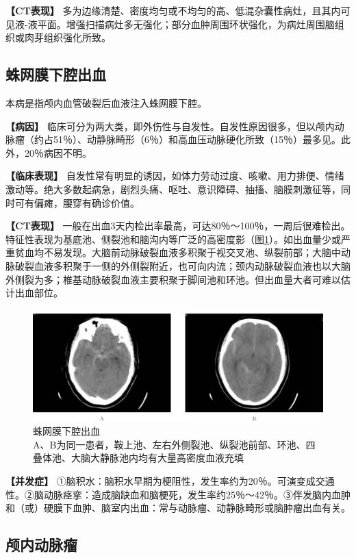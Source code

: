 \textbf{【CT表现】}
多为边缘清楚、密度均匀或不均匀的高、低混杂囊性病灶，且其内可见液-液平面。增强扫描病灶多无强化；部分血肿周围环状强化，为病灶周围脑组织或肉芽组织强化所致。

\subsection{蛛网膜下腔出血}

本病是指颅内血管破裂后血液注入蛛网膜下腔。

\textbf{【病因】}
临床可分为两大类，即外伤性与自发性。自发性原因很多，但以颅内动脉瘤（约占51％）、动静脉畸形（6％）和高血压动脉硬化所致（15％）最多见。此外，20％病因不明。

\textbf{【临床表现】}
自发性常有明显的诱因，如体力劳动过度、咳嗽、用力排便、情绪激动等。绝大多数起病急，剧烈头痛、呕吐、意识障碍、抽搐、脑膜刺激征等，同时可有偏瘫，腰穿有确诊价值。

\textbf{【CT表现】}
一般在出血3天内检出率最高，可达80％～100％，一周后很难检出。特征性表现为基底池、侧裂池和脑沟内等广泛的高密度影（图\ref{fig2-26}）。如出血量少或严重贫血均不易发现。大脑前动脉破裂血液多积聚于视交叉池、纵裂前部；大脑中动脉破裂血液多积聚于一侧的外侧裂附近，也可向内流；颈内动脉破裂血液也以大脑外侧裂为多；椎基动脉破裂血液主要积聚于脚间池和环池。但出血量大者可难以估计出血部位。

\begin{figure}[!htbp]
 \centering
 \includegraphics[width=.7\textwidth,height=\textheight,keepaspectratio]{./images/Image00044.jpg}
 \captionsetup{justification=centering}
 \caption{蛛网膜下腔出血\\{\small A、B为同一患者，鞍上池、左右外侧裂池、纵裂池前部、环池、四叠体池、大脑大静脉池内均有大量高密度血液充填}}
 \label{fig2-26}
  \end{figure} 

\textbf{【并发症】}
①脑积水：脑积水早期为梗阻性，发生率约为20％。可演变成交通性。②脑动脉痉挛：造成脑缺血和脑梗死，发生率约25％～42％。③伴发脑内血肿和（或）硬膜下血肿、脑室内出血：常与动脉瘤、动静脉畸形或脑肿瘤出血有关。

\subsection{颅内动脉瘤}

